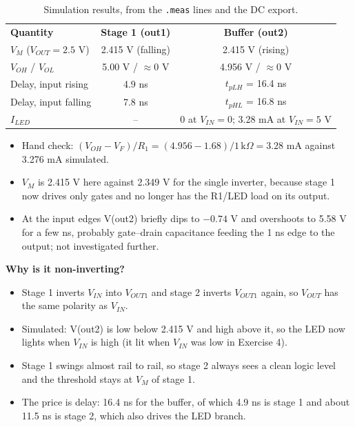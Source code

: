 \documentclass[11pt,a4paper]{article}
\begin{document}
\begin{table}[H]\centering\small\sffamily
\begin{tabular}{@{}lcc@{}}\rowcolor{teal}\color{white}\textbf{Quantity}&\color{white}\textbf{Stage 1 (out1)}&\color{white}\textbf{Buffer (out2)}\\
$V_M$ ($V_{OUT}=2.5$ V)&2.415 V (falling)&2.415 V (rising)\\
\rowcolor{mist}$V_{OH}$ / $V_{OL}$&5.00 V / $\approx0$ V&4.956 V / $\approx0$ V\\
Delay, input rising&4.9 ns&$t_{pLH}$ = 16.4 ns\\
\rowcolor{mist}Delay, input falling&7.8 ns&$t_{pHL}$ = 16.8 ns\\
$I_{LED}$&--&0 at $V_{IN}=0$; 3.28 mA at $V_{IN}=5$ V\\\end{tabular}
\caption{Simulation results, from the \texttt{.meas} lines and the DC export.}\end{table}
\begin{itemize}
\item Hand check: $(V_{OH}-V_F)/R_1=(4.956-1.68)/1\,\mathrm{k}\Omega=3.28$ mA against 3.276 mA simulated.
\item $V_M$ is 2.415 V here against 2.349 V for the single inverter, because stage 1 now drives only gates and no longer has the R1/LED load on its output.
\item At the input edges V(out2) briefly dips to $-0.74$ V and overshoots to 5.58 V for a few ns, probably gate--drain capacitance feeding the 1 ns edge to the output; not investigated further.
\end{itemize}
\begin{answer}
\textbf{Why is it non-inverting?}
\begin{itemize}
\item Stage 1 inverts $V_{IN}$ into $V_{OUT1}$ and stage 2 inverts $V_{OUT1}$ again, so $V_{OUT}$ has the same polarity as $V_{IN}$.
\item Simulated: V(out2) is low below 2.415 V and high above it, so the LED now lights when $V_{IN}$ is high (it lit when $V_{IN}$ was low in Exercise 4).
\item Stage 1 swings almost rail to rail, so stage 2 always sees a clean logic level and the threshold stays at $V_M$ of stage 1.
\item The price is delay: 16.4 ns for the buffer, of which 4.9 ns is stage 1 and about 11.5 ns is stage 2, which also drives the LED branch.
\end{itemize}
\end{answer}
\end{document}
